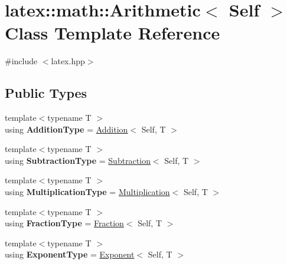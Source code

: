 \hypertarget{classlatex_1_1math_1_1Arithmetic}{\section{latex\-:\-:math\-:\-:Arithmetic$<$ Self $>$ Class Template Reference}
\label{classlatex_1_1math_1_1Arithmetic}
}


{\ttfamily \#include $<$latex.\-hpp$>$}

\subsection*{Public Types}
\begin{DoxyCompactItemize}
\item 
\hypertarget{classlatex_1_1math_1_1Arithmetic_a33d9ffed366ea87e7c32df497e0b9d32}{{\footnotesize template$<$typename T $>$ }\\using {\bfseries Addition\-Type} = \hyperlink{classlatex_1_1math_1_1Addition}{Addition}$<$ Self, T $>$}\label{classlatex_1_1math_1_1Arithmetic_a33d9ffed366ea87e7c32df497e0b9d32}

\item 
\hypertarget{classlatex_1_1math_1_1Arithmetic_a9a49c562d2e384aaec7b6e0f52932eac}{{\footnotesize template$<$typename T $>$ }\\using {\bfseries Subtraction\-Type} = \hyperlink{classlatex_1_1math_1_1Subtraction}{Subtraction}$<$ Self, T $>$}\label{classlatex_1_1math_1_1Arithmetic_a9a49c562d2e384aaec7b6e0f52932eac}

\item 
\hypertarget{classlatex_1_1math_1_1Arithmetic_a554373e2a106a04eb060a15141d0cac9}{{\footnotesize template$<$typename T $>$ }\\using {\bfseries Multiplication\-Type} = \hyperlink{classlatex_1_1math_1_1Multiplication}{Multiplication}$<$ Self, T $>$}\label{classlatex_1_1math_1_1Arithmetic_a554373e2a106a04eb060a15141d0cac9}

\item 
\hypertarget{classlatex_1_1math_1_1Arithmetic_a55d6e6be63edc6fea45195fe953ab902}{{\footnotesize template$<$typename T $>$ }\\using {\bfseries Fraction\-Type} = \hyperlink{classlatex_1_1math_1_1Fraction}{Fraction}$<$ Self, T $>$}\label{classlatex_1_1math_1_1Arithmetic_a55d6e6be63edc6fea45195fe953ab902}

\item 
\hypertarget{classlatex_1_1math_1_1Arithmetic_a71daf5ab720de2222a40ea2539b6e24e}{{\footnotesize template$<$typename T $>$ }\\using {\bfseries Exponent\-Type} = \hyperlink{classlatex_1_1math_1_1Exponent}{Exponent}$<$ Self, T $>$}\label{classlatex_1_1math_1_1Arithmetic_a71daf5ab720de2222a40ea2539b6e24e}


\end{DoxyCompactItemize}

